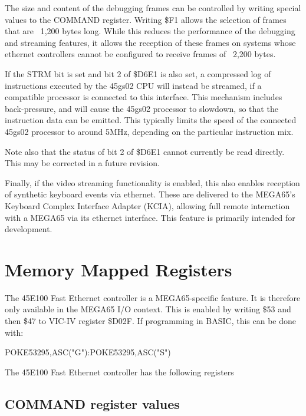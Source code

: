 The size and content of the debugging frames can be controlled by writing special values to the
COMMAND register.  Writing \$F1 allows the selection of frames that are ~1,200 bytes long.
While this reduces the performance of the debugging and streaming features, it allows the reception
of these frames on systems whose ethernet controllers cannot be configured to receive frames
of ~2,200 bytes.

If the STRM bit is set and bit 2 of \$D6E1 is also set, a compressed log of instructions executed by
the 45gs02 CPU will instead be streamed, if a compatible processor is connected to this interface.
This mechanism includes back-pressure, and will cause the 45gs02 processor to slowdown,
so that the instruction data can be emitted.  This typically limits the speed of the connected
45gs02 processor to around 5MHz, depending on the particular instruction mix.

Note also that
the status of bit 2 of \$D6E1 cannot currently be read directly. This may be corrected in a future
revision.

Finally, if the video streaming functionality is enabled, this also enables reception of synthetic
keyboard events via ethernet.  These are delivered to the MEGA65's Keyboard Complex Interface Adapter
(KCIA), allowing full remote interaction with a MEGA65 via its ethernet interface.  This feature is
primarily intended for development.

\section{Memory Mapped Registers}

The 45E100 Fast Ethernet controller is a MEGA65-specific feature.
It is therefore only available in the MEGA65 I/O context.
This is enabled by writing \$53 and then \$47 to VIC-IV register \$D02F.
If programming in BASIC, this can be done with:

\begin{screenoutput}
POKE53295,ASC("G"):POKE53295,ASC("S")
\end{screenoutput}

The 45E100 Fast Ethernet controller has the following registers



\subsection{COMMAND register values}

